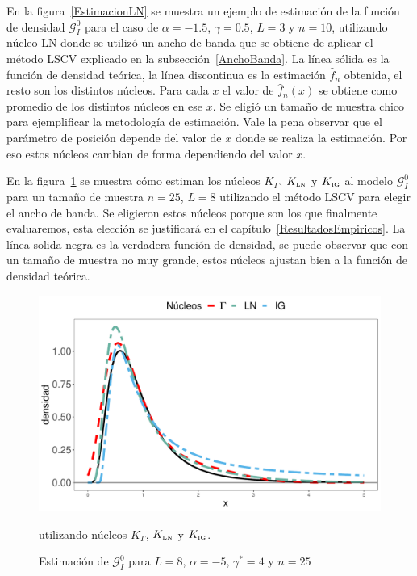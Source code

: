 En la figura~\ref{EstimacionLN} se muestra un ejemplo de estimación de la función de densidad $\mathcal{G}_I^0$ para el caso de $\alpha=-1.5$, $\gamma=0.5$, $L=3$ y $n=10$, utilizando núcleo LN donde se utilizó un ancho de banda que se obtiene de aplicar el método LSCV explicado en la subsección~\ref{AnchoBanda}. La línea sólida es la función de densidad teórica, la línea discontinua es la estimación $\widehat{f}_n$ obtenida, el resto son los distintos núcleos. Para cada $x$ el valor de $\widehat{f}_n(x)$ se obtiene como promedio de los distintos núcleos en ese $x$. Se eligió un tamaño de muestra chico para ejemplificar la metodología de estimación. Vale la pena observar que el parámetro de posición depende del valor de $x$ donde se realiza la estimación. Por eso estos núcleos cambian de forma dependiendo del valor $x$.

En la figura~\ref{EstimacionLNyGAyIG} se muestra cómo estiman los núcleos $K_{\Gamma}$, $K_{\text{\tiny{LN}}}$ y $K_{\text{\tiny{IG}}}$ al modelo $\mathcal{G}_I^0$ para un tamaño de muestra $n=25$, $L=8$ utilizando el método LSCV para elegir el ancho de banda. Se eligieron estos núcleos porque son los que finalmente evaluaremos, esta elección se justificará en el capítulo~\ref{ResultadosEmpiricos}. 
La línea solida negra es la verdadera función de densidad, se puede observar que con un tamaño de muestra no muy grande, estos núcleos ajustan bien a la función de densidad teórica.

\begin{figure}[hbt]
	\centering
	\includegraphics[scale=0.5]{../../Figures/Tesis/Capitulo5/NucleosGALNyIG.pdf}
	\caption{\label{EstimacionLNyGAyIG}Estimación de $\mathcal{G}_I^0$ para $L=8$, $\alpha=-5$, $\gamma^*=4$ y $n=25$} utilizando núcleos $K_{\Gamma}$, $K_{\text{\tiny{LN}}}$ y $K_{\text{\tiny{IG}}}$.
\end{figure}

